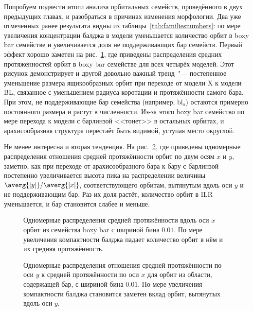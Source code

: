\documentclass[tikz]{trlnotes}
\begin{document}
Попробуем подвести итоги анализа орбитальных семейств, проведённого в двух предыдущих главах,
и разобраться в причинах изменения морфологии.  Два уже отмеченных ранее результата видны из
таблицы~\ref{tab:familiesnumbers}: по мере увеличения концентрации балджа в модели уменьшается количество орбит в
boxy bar семействе и увеличивается доля не поддерживающих бар семейств.
Первый эффект хорошо заметен на рис.~\ref{fig:boxyamplcomp}, где приведены распределения средних протяжённостей орбит в boxy bar семействе для всех четырёх моделей. Этот рисунок демонстрирует и другой довольно важный тренд~"--- постепенное уменьшение размера ящикообразных орбит при переходе от модели X к модели BL, связанное с уменьшением радиуса коротации и протяжённости самого бара. При этом, не поддерживающие бар семейства (например, $\text{bl}_{\text{o}}$) остаются примерно постоянного размера и растут в численности. Из-за этого boxy bar семейство по мере перехода к модели с барлинзой <<тонет>> в остальных орбитах, и арахисообразная структура перестаёт быть видимой, уступая место округлой.

Не менее интересна и вторая тенденция. На рис.~\ref{fig:axisratio}, где приведены одномерные распределения отношения средней протяжённости орбит по двум осям $x$ и $y$, заметно, как при переходе от арахисообразного бара к бару с барлинзой 
постепенно увеличивается высота пика на распределении величины $\averg{|y|}/\averg{|x|}$, соответствующего орбитам, вытянутым вдоль оси
$y$ и не поддерживающим бар. Раз их доля растёт, количество орбит в ILR уменьшается, и бар становится слабее и
меньше. 

\begin{figure}[htpb]
  \centering
  \caption{Одномерные распределения средней протяжённости вдоль оси $x$ орбит из семейства boxy bar с шириной бина $0.01$.
  По мере увеличения компактности балджа падает количество орбит в нём и их средняя протяжённость.}
  \label{fig:boxyamplcomp}
\end{figure}

\begin{figure}[htpb]
  \centering
  \caption{Одномерные распределения отношения средней протяжённости по оси $y$ к средней протяжённости по оси $x$ для орбит из области, содержащей бар, с шириной бина $0.01$. По мере увеличения компактности балджа становится заметен вклад орбит, вытянутых вдоль оси $y$.}
  \label{fig:axisratio}
\end{figure}
\end{document}
